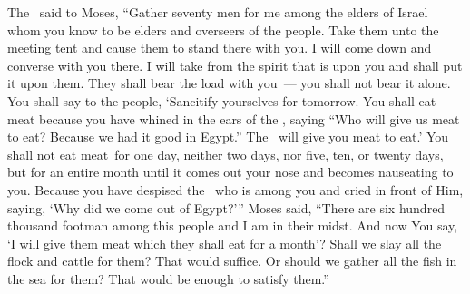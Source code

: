 \begin{inparaenum}
   The \lord\ said to Moses, ``Gather seventy men for me among the elders of Israel whom you know to be elders and overseers of the people. Take them unto the meeting tent and cause them to stand there with you.%
   I will come down and converse with you there. I will take from the spirit that is upon you and shall put it upon them. They shall bear the load with you~--- you shall not bear it alone.%
   You shall say to the people, `Sancitify yourselves for tomorrow. You shall eat meat because you have whined in the ears of the \lord, saying ``Who will give us meat to eat? Because we had it good in Egypt.'' The \lord\ will give you meat to eat.'%
   You shall not eat meat\understood{}\ for one day, neither two days, nor five, ten, or twenty days,%
   but for an entire month until it comes out your nose and becomes nauseating to you. Because you have despised the \lord\ who is among you and cried in front of Him, saying, `Why did we come out of Egypt?'\thinspace''%
   Moses said, ``There are six hundred thousand footman among this people and I am in their midst. And now You say, `I will give them meat which they shall eat for a month'?%
   Shall we slay all the flock and cattle for them? That would suffice. Or should we gather all the fish in the sea for them? That would be enough to satisfy them.''%


\end{inparaenum}
